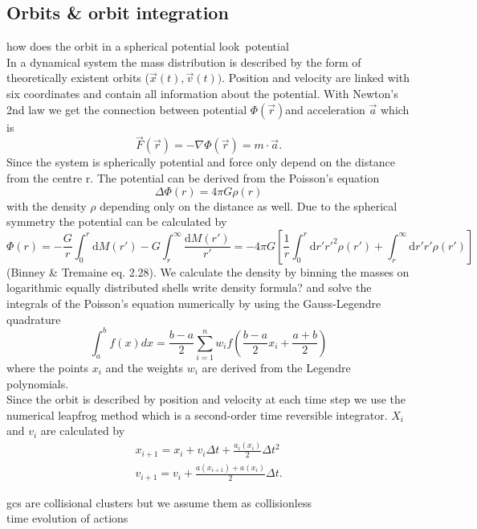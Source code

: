 \subsection{Orbits \& orbit integration}\label{orbit_theory}
\color{red} how does the orbit in a spherical potential look\ potential\\ \color{black}
In a dynamical system the mass distribution is described by the form of theoretically existent orbits (\(\vec{x}(t),\vec{v}(t))\). Position and velocity are linked with six coordinates and contain all information about the potential. With Newton's 2nd law we get the connection between potential \(\Phi(\vec{r})\)and acceleration \(\vec{a}\) which is \[\vec{F}(\vec{r})=-\nabla\Phi(\vec{r})=m\cdot\vec{a}.\] Since the system is spherically potential and force only depend on the distance from the centre r. The potential can be derived from the Poisson's equation \begin{equation}
\Delta\Phi(r)=4\pi G \rho(r)
\end{equation}
with the density \(\rho\) depending only on the distance as well. Due to the spherical symmetry the potential can be calculated by 
\begin{equation}
\Phi(r)=-\frac{G}{r}\int_0^r{\mathrm{d}M(r')}-G\int_r^{\infty}{\frac{\mathrm{d}M(r')}{r'}}=-4\pi G\left[\frac{1}{r}\int_0^r\mathrm{d}r'r'^2\rho(r')+\int_r^{\infty}\mathrm{d}r'r'\rho(r')\right]
\end{equation} (Binney \& Tremaine eq. 2.28). We calculate the density by binning the masses on logarithmic equally distributed shells \color{red} write density formula? \color{black} and solve the integrals of the Poisson's equation numerically by using the Gauss-Legendre quadrature \[\int_a^b f(x)dx = \frac{b-a}{2}\sum_{i=1}^n w_i f\left(\frac{b-a}{2}x_i+\frac{a+b}{2}\right)\] where the points \(x_i\) and the weights \(w_i\) are derived from the Legendre polynomials.\\ Since the orbit is described by position and velocity at each time step we use the numerical leapfrog method which is a second-order time reversible integrator. \(X_i\) and \(v_i\) are calculated by 
\begin{align*}
x_{i+1}=x_i+v_i\Delta t+\frac{a_i(x_i)}{2}\Delta t^2 \\
v_{i+1}=v_i+\frac{a(x_{i+1})+a(x_i)}{2}\Delta t.
\end{align*}

\color{red} gcs are collisional clusters but we assume them as collisionless \\ time evolution of actions \color{black}



